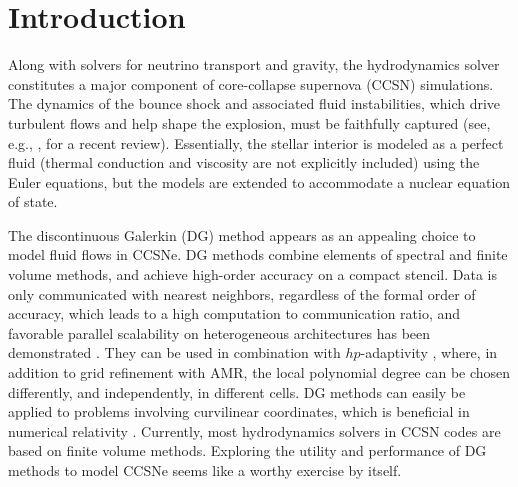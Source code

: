 \documentclass[letterpaper]{jpconf}
\begin{document}
\section{Introduction}

Along with solvers for neutrino transport and gravity, the hydrodynamics solver constitutes a major component of core-collapse supernova (CCSN) simulations.  
The dynamics of the bounce shock and associated fluid instabilities, which drive turbulent flows and help shape the explosion, must be faithfully captured (see, e.g., \cite{muller_2016}, for a recent review).  
Essentially, the stellar interior is modeled as a perfect fluid (thermal conduction and viscosity are not explicitly included) using the Euler equations, but the models are extended to accommodate a nuclear equation of state.  

The discontinuous Galerkin (DG) method \cite{cockburnShu_2001,hesthavenWarburton_2008} appears as an appealing choice to model fluid flows in CCSNe.  
DG methods combine elements of spectral and finite volume methods, and achieve high-order accuracy on a compact stencil.  
Data is only communicated with nearest neighbors, regardless of the formal order of accuracy, which leads to a high computation to communication ratio, and favorable parallel scalability on heterogeneous architectures has been demonstrated \cite{klockner_etal_2009}.  
They can be used in combination with $hp$-adaptivity \cite{remacle_etal_2003}, where, in addition to grid refinement with AMR, the local polynomial degree can be chosen differently, and independently, in different cells.  
DG methods can easily be applied to problems involving curvilinear coordinates, which is beneficial in numerical relativity \cite{teukolsky_2016}.  
Currently, most hydrodynamics solvers in CCSN codes are based on finite volume methods.  
Exploring the utility and performance of DG methods to model CCSNe seems like a worthy exercise by itself.  
\end{document}
